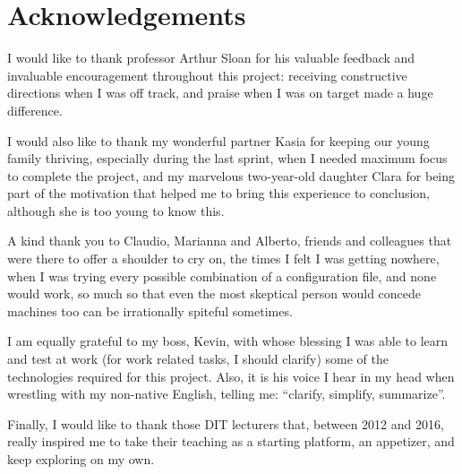 \chapter{Acknowledgements}
I would like to thank professor Arthur Sloan for his valuable feedback and
invaluable encouragement throughout this project: receiving constructive
directions when I was off track, and praise when I was on target made a huge
difference.

I would also like to thank my wonderful partner Kasia for keeping our young
family thriving, especially during the last sprint, when I needed maximum focus
to complete the project, and my marvelous two-year-old daughter Clara for being
part of the motivation that helped me to bring this experience to conclusion,
although she is too young to know this.

A kind thank you to Claudio, Marianna and Alberto, friends and colleagues that
were there to offer a shoulder to cry on, the times I felt I was getting
nowhere, when I was trying every possible combination of a configuration file,
and none would work, so much so that even the most skeptical person would
concede machines too can be irrationally spiteful sometimes.

I am equally grateful to my boss, Kevin, with whose blessing I was able to
learn and test at work (for work related tasks, I should clarify) some of the
technologies required for this project. Also, it is his voice I hear in my head
when wrestling with my non-native English, telling me: ``clarify,
simplify, summarize''.

Finally, I would like to thank those DIT lecturers that, between 2012 and 2016,
really inspired me to take their teaching as a starting platform, an appetizer,
and keep exploring on my own.
